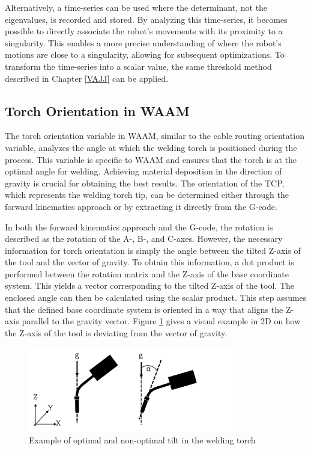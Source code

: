 Alternatively, a time-series can be used where the determinant, not the eigenvalues, is recorded and stored. By analyzing this time-series, it becomes possible to directly associate the robot's movements with its proximity to a singularity. This enables a more precise understanding of where the robot's motions are close to a singularity, allowing for subsequent optimizations. To transform the time-series into a scalar value, the same threshold method described in Chapter \ref{VAJJ} can be applied.


\subsection{Torch Orientation in WAAM}
The torch orientation variable in \acrshort{WAAM}, similar to the cable routing orientation variable, analyzes the angle at which the welding torch is positioned during the process. This variable is specific to \acrshort{WAAM} and ensures that the torch is at the optimal angle for welding. Achieving material deposition in the direction of gravity is crucial for obtaining the best results. The orientation of the \acrshort{TCP}, which represents the welding torch tip, can be determined either through the forward kinematics approach or by extracting it directly from the G-code.

In both the forward kinematics approach and the G-code, the rotation is described as the rotation of the A-, B-, and C-axes. However, the necessary information for torch orientation is simply the angle between the tilted Z-axis of the tool and the vector of gravity. To obtain this information, a dot product is performed between the rotation matrix and the Z-axis of the base coordinate system. This yields a vector corresponding to the tilted Z-axis of the tool. The enclosed angle can then be calculated using the scalar product. This step assumes that the defined base coordinate system is oriented in a way that aligns the Z-axis parallel to the gravity vector. Figure \ref{tilt} gives a visual example in 2D on how the Z-axis of the tool is deviating from the vector of gravity.

\begin{figure}[H]
	\centerline{\includegraphics[width=0.8\textwidth]{figures/ttilt.png}}
	\caption{Example of optimal and non-optimal tilt in the welding torch}
	\label{tilt}
\end{figure}

